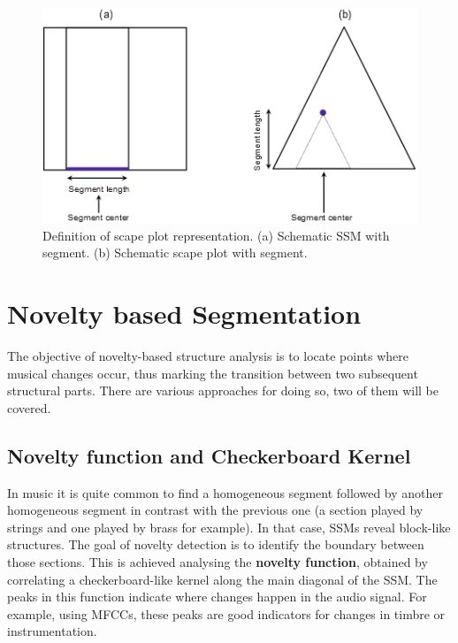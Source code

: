 \documentclass[a4paper, 9pt, twocolumn]{extarticle}
\begin{document}
\begin{figure}[h]
	\centering
	\includegraphics[width=\linewidth]{images/scapePlot.png}
	\caption{Definition of scape plot representation. (a) Schematic SSM with segment. (b) Schematic
scape plot with segment.}
	\label{fig:scapePlot}
\end{figure}

\section{Novelty based Segmentation}
\label{section:novelty}

The objective of novelty-based structure analysis is to locate points where musical changes occur, thus marking the transition between two subsequent structural parts. There are various approaches for doing so, two of them will be covered. 

\subsection{Novelty function and Checkerboard  Kernel}
\label{subsection:noveltyKernel}

In music it is quite common to find a homogeneous segment followed by another homogeneous segment in
contrast with the previous one (a section played by strings and one played by brass for example). In that case, SSMs reveal block-like structures. The goal of novelty detection is to identify the boundary between those sections. This is achieved analysing the \textbf{novelty function}, obtained  by correlating a checkerboard-like kernel along the main diagonal of the SSM. The peaks in this function indicate where changes happen in the audio signal. For example, using MFCCs, these peaks are good indicators for changes in timbre or instrumentation.
\end{document}
